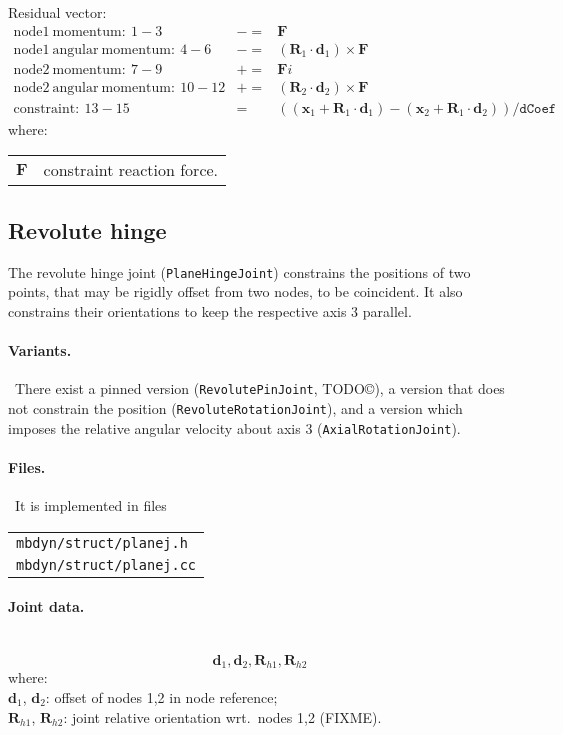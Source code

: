 \documentclass[10pt,dvips,fleqn,subeqn]{report}
\newcommand{\T}[1]{\bm{#1}}
\begin{document}
\noindent
Residual vector:
\begin{eqnarray*}
	\mathrm{node1\ momentum}:\ 1-3& -= & \T F \\
	\mathrm{node1\ angular\ momentum}:\ 4-6& -= & 
		(\T R_1\cdot \T d_1) \times \T F \\
	\mathrm{node2\ momentum}:\ 7-9& += & \T Fi \\
	\mathrm{node2\ angular\ momentum}:\ 10-12& += & 
		(\T R_2\cdot \T d_2) \times \T F \\
	\mathrm{constraint}:\ 13-15& = &  ((\T x_1+\T R_1\cdot \T d_1) - 
			(\T x_2+\T R_1\cdot \T d_2))/\texttt{dCoef}
\end{eqnarray*}
where:

\noindent
\begin{tabular}{ll}
$\T{F}$ & constraint reaction force.
\end{tabular}



\subsection{Revolute hinge}
The revolute hinge joint (\texttt{PlaneHingeJoint}) constrains the positions 
of two points, that may be rigidly offset from two nodes, 
to be coincident.
It also constrains their orientations to keep the respective axis 3 
parallel.

\paragraph{Variants.} \
There exist a pinned version (\texttt{RevolutePinJoint}, TODO\copyright),
a version that does not constrain the position (\texttt{RevoluteRotationJoint}),
and a version which imposes the relative angular velocity about axis 3
(\texttt{AxialRotationJoint}).

\paragraph{Files.} \
It is implemented in files

\begin{tabular}{l}
\texttt{mbdyn/struct/planej.h} \\
\texttt{mbdyn/struct/planej.cc}
\end{tabular}

\paragraph{Joint data.} \
\begin{equation}
\T d_1, \T d_2, \T R_{h1}, \T R_{h2}
\end{equation}
where:\\
$\T d_1$, $\T d_2$: offset of nodes 1,2 in node reference;\\
$\T R_{h1}$, $\T R_{h2}$: joint relative orientation wrt.\ nodes 1,2 (FIXME).\\
\end{document}
